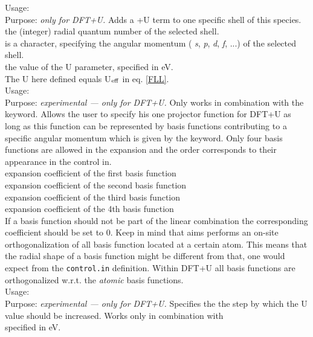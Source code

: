 {
  \noindent
  Usage:     \\[1.0ex]
  Purpose: \emph{only for DFT+U.} Adds a +U term to one
    specific shell of this species. \\[1.0ex] 
   the (integer) radial quantum number of the selected shell. \\
   is a character, specifying the angular momentum (
    \emph{s}, \emph{p}, \emph{d}, \emph{f}, ...) of the selected shell. \\
   the value of the U parameter, specified in eV. \\[1.0ex]
  The U here defined equals U$_{\rm eff}$ in eq. \ref{FLL}.\\
}
{
  \noindent
  Usage:      \\[1.0ex]
  Purpose: \emph{experimental --- only for DFT+U.} Only works in combination with the 
    keyword. Allows the user to specify his one projector function for DFT+U as long as this function can be
    represented by basis functions contributing to a specific angular momentum which is given by the
     keyword. Only four basis functions are allowed in the expansion and the order corresponds to
    their appearance in the control in. \\[1.0ex] 
     expansion coefficient of the first basis function\\
     expansion coefficient of the second basis function\\
     expansion coefficient of the third basis function\\
     expansion coefficient of the 4th basis function\\[1.0ex]
    If a basis function should not be part of the linear combination the corresponding coefficient should be set to 0.
    Keep in mind that aims performs an on-site orthogonalization of all basis function located at a certain atom. This means
    that the radial shape of a basis function might be different from that, one would expect from the \texttt{control.in}
    definition. Within DFT+U all basis functions are orthogonalized w.r.t. the \textit{atomic} basis functions.\\
}
{
  \noindent
  Usage:   \\[1.0ex]
  Purpose: \emph{experimental --- only for DFT+U.} Specifies the the step by which the
    U value should be increased. Works only in combination with \\[1.0ex]
   specified in eV. \\
}